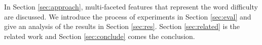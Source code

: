 In Section \ref{sec:approach}, multi-faceted features that represent the word difficulty are discussed. 
We introduce the process of experiments in Section \ref{sec:eval} and give an analysis of the results in Section \ref{sec:res}.
Section \ref{sec:related} is the related work and Section \ref{sec:conclude} comes the conclusion.
